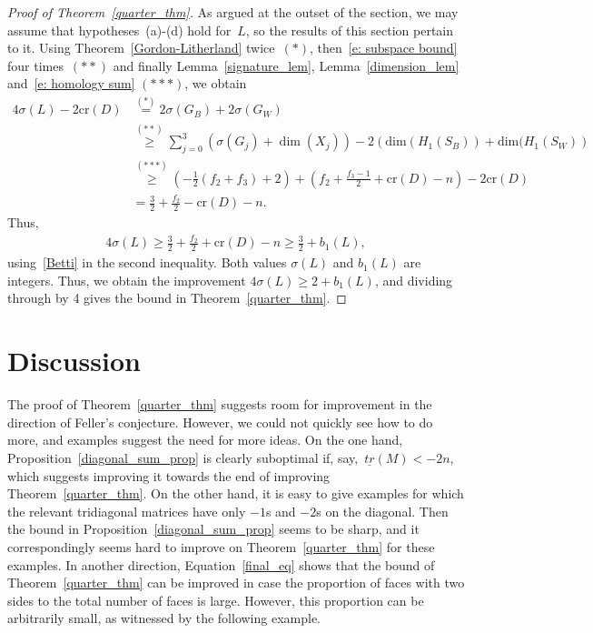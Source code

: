 \documentclass[AHL,Unicode,longabstracts,published]{cedram}
\newcommand{\rcr}{\mathrm{cr}}
\newcommand{\rdim}{\mathrm{dim}}
\begin{document}
\begin{proof}[Proof of Theorem~\ref{quarter_thm}]
As argued at the outset of the section, we may assume that hypotheses~(a)-(d) hold for~$L$, so the results of this section pertain to it. Using {Theorem}~\ref{Gordon-Litherland} twice~$(\ast)$, then~\eqref{e: subspace bound} four times~$(\ast\ast)$ and finally Lemma~\ref{signature_lem}, Lemma~\ref{dimension_lem} and~\eqref{e: homology sum} $(\ast\ast\ast)$, we obtain
\begin{align*}
4\sigma(L) - 2\rcr (D) &\overset{(\ast)}= 2\sigma(G_B) + 2\sigma(G_W) \\
&\overset{(\ast\ast)}\ge \sum_{j=0}^3 \left(\sigma(G_j) + \dim(X_j)\right) - 2 \left(\rdim (H_1(S_B)) + \rdim (H_1(S_W)\right)\\
&\overset{(\ast\ast\ast)}\ge \left(-\frac{1}{2}(f_2 + f_3) + 2 \right) + \left(f_2 + \frac{f_3-1}{2} +
\rcr (D) - n \right) - 2 \rcr (D) \\
&= \frac{3}{2} + \frac{f_2}{2} -\rcr (D)-n.
\end{align*}
Thus,
\begin{align}\label{final_eq}
4\sigma(L) \ge \frac{3}{2} + \frac{f_2}{2} + \rcr (D)-n \ge \frac{3}{2} + b_1(L),
\end{align}
using~\eqref{Betti} in the second inequality. Both values $\sigma(L)$ and $b_1(L)$ are integers. Thus, we obtain the improvement $4 \sigma(L) \ge 2 + b_1(L)$, and dividing through by 4 gives the bound in Theorem~\ref{quarter_thm}.
\end{proof}



\section{Discussion}\label{s: discussion}

The proof of Theorem~\ref{quarter_thm} suggests room for improvement in the direction of Feller's conjecture. However, we could not quickly see how to do more, and examples suggest the need for more ideas. On the one hand, Proposition~\ref{diagonal_sum_prop} is clearly suboptimal if, say,~$\underline{tr}(M) < -2n$, which suggests improving it towards the end of improving Theorem~\ref{quarter_thm}. On the other hand, it is easy to give examples for which the relevant tridiagonal matrices have only $-1$s and $-2$s on the diagonal. Then the bound in Proposition~\ref{diagonal_sum_prop} seems to be sharp, and it correspondingly seems hard to improve on Theorem~\ref{quarter_thm} for these examples. In another direction, Equation~\eqref{final_eq} shows that the bound of Theorem~\ref{quarter_thm} can be improved in case the proportion of faces with two sides to the total number of faces is large. However, this proportion can be arbitrarily small, as witnessed by the following example.
\end{document}
